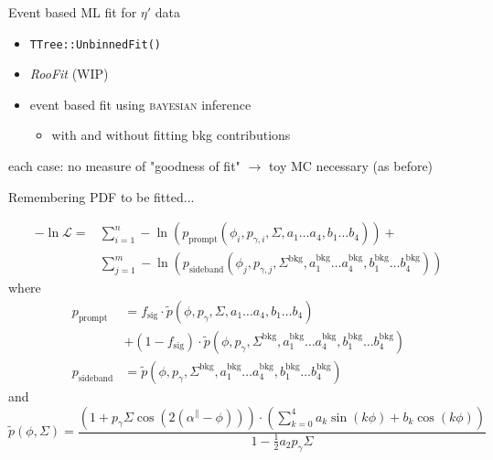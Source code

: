 \documentclass[11pt,aspectratio=169,dvipsnames]{beamer}
\newcommand{\thecolor}{black!70!blue}
\newcommand{\thedate}{30th March 2022}
\begin{document}
	
	
\begin{frame}{Event based ML fit for $\eta'$ data}
		\begin{tcolorbox}[colback=blue!5,colframe=\thecolor,title=Methods]
			\begin{itemize}
				\item \texttt{TTree::UnbinnedFit()}
				\item \emph{RooFit} (WIP)
				\item event based fit using \textsc{bayesian} inference
				\begin{itemize}
					\item with and without fitting bkg contributions
				\end{itemize}
			\end{itemize}
		\end{tcolorbox}
	each case: no measure of "goodness of fit" $\to$ toy MC necessary (as before)
\end{frame}
\begin{frame}{Remembering PDF to be fitted...}

		\begin{align*}
			-\ln\mathcal{L}=&\sum_{i=1}^{n}-\ln(p_\text{prompt}(\phi_i,p_{\gamma,i},\Sigma,a_1\dots a_4,b_1\dots b_4))+\\
			&\sum_{j=1}^{m}-\ln\left(p_\text{sideband}(\phi_j,p_{\gamma,j},\Sigma^\text{bkg},a_1^\text{bkg}\dots a_4^\text{bkg},b_1^\text{bkg}\dots b_4^\text{bkg})\right)
		\end{align*}
		where
		\begin{align*}
			p_\text{prompt}&=f_{\text{sig}}\cdot\tilde{p}(\phi,p_\gamma,\Sigma,a_1\dots a_4, b_1\dots b_4)\\ &+ \left(1-f_\text{sig}\right)\cdot\tilde{p}(\phi,p_\gamma,\Sigma^\text{bkg},a_1^\text{bkg}\dots a_4^\text{bkg}, b_1^\text{bkg}\dots b_4^\text{bkg})\\
			p_\text{sideband}&=\tilde{p}(\phi,p_\gamma,\Sigma^\text{bkg},a_1^\text{bkg}\dots a_4^\text{bkg}, b_1^\text{bkg}\dots b_4^\text{bkg})
		\end{align*}
		and \begin{equation*}
			\tilde{p}(\phi,\Sigma)=\frac{\left(1+p_\gamma\Sigma\cos\left(2\left(\alpha^\parallel-\phi\right)\right)\right)\cdot\left(\sum_{k=0}^{4}a_k\sin(k\phi)+b_k\cos(k\phi)\right)}{1-\frac{1}{2}a_2p_\gamma\Sigma}
		\end{equation*}

\end{frame}
\end{document}
